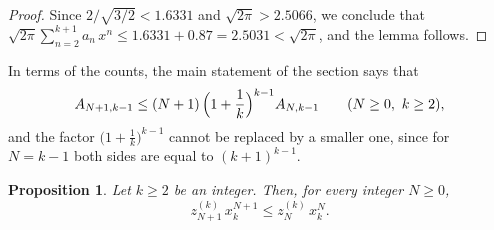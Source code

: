 \documentclass{amsart}
\newtheorem{proposition}[theorem]{Proposition}
\theoremstyle{definition}
\theoremstyle{remark}
\numberwithin{equation}{section}
\begin{document}
\begin{proof}
Since $2/\sqrt{3/2}<1.6331$ and $\sqrt{2\pi}>2.5066$, we conclude that $\sqrt{2\pi}\sum_{n=2}^{k+1}a_n\,x^{n}\le 1.6331+0.87=2.5031<\sqrt{2\pi}$, and the lemma follows.
\end{proof}

In terms of the counts, the main statement of the section says that
\[
A_{N+1,k-1}\le(N+1)\,\Bigl(1+\frac1k\Bigr)^{k-1}A_{N,k-1}\qquad(N\ge 0,\ k\ge 2),
\]
and the factor $\bigl(1+\frac1k\bigr)^{k-1}$ cannot be replaced by a smaller one, since for $N=k-1$ both sides are equal to $(k+1)^{k-1}$.

\begin{proposition}\label{prop:criticalmonotone}
Let $k\ge 2$ be an integer. Then, for every integer $N\ge 0$,
\[
z^{(k)}_{N+1}\,x_k^{N+1}\le z^{(k)}_N\,x_k^{N}.
\]
\end{proposition}
\end{document}
